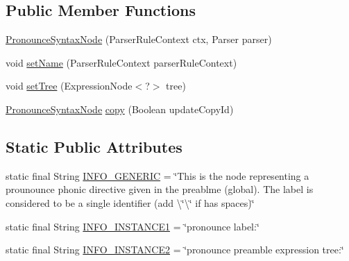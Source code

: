 \subsection*{Public Member Functions}
\begin{DoxyCompactItemize}
\item 
\hyperlink{classit_1_1emarolab_1_1cagg_1_1core_1_1language_1_1syntax_1_1abstractTree_1_1syntaxNodeType_1_1PronounceSyntaxNode_a4c5b3ed5af8e478d7720216115608e27}{Pronounce\-Syntax\-Node} (Parser\-Rule\-Context ctx, Parser parser)
\item 
void \hyperlink{classit_1_1emarolab_1_1cagg_1_1core_1_1language_1_1syntax_1_1abstractTree_1_1syntaxNodeType_1_1PronounceSyntaxNode_aa92e590581339e65323a09a8c3d971b4}{set\-Name} (Parser\-Rule\-Context parser\-Rule\-Context)
\item 
void \hyperlink{classit_1_1emarolab_1_1cagg_1_1core_1_1language_1_1syntax_1_1abstractTree_1_1syntaxNodeType_1_1PronounceSyntaxNode_af9922ffb9217a5644c46b11cbda3cd87}{set\-Tree} (Expression\-Node$<$?$>$ tree)
\item 
\hyperlink{classit_1_1emarolab_1_1cagg_1_1core_1_1language_1_1syntax_1_1abstractTree_1_1syntaxNodeType_1_1PronounceSyntaxNode}{Pronounce\-Syntax\-Node} \hyperlink{classit_1_1emarolab_1_1cagg_1_1core_1_1language_1_1syntax_1_1abstractTree_1_1syntaxNodeType_1_1PronounceSyntaxNode_aea92e0fef62d0d6a946026b843443093}{copy} (Boolean update\-Copy\-Id)
\end{DoxyCompactItemize}
\subsection*{Static Public Attributes}
\begin{DoxyCompactItemize}
\item 
static final String \hyperlink{classit_1_1emarolab_1_1cagg_1_1core_1_1language_1_1syntax_1_1abstractTree_1_1syntaxNodeType_1_1PronounceSyntaxNode_a3344aa57e56babfc6981dea0a04d538f}{I\-N\-F\-O\-\_\-\-G\-E\-N\-E\-R\-I\-C} = \char`\"{}This is the node representing a prounounce phonic directive given in the preablme (global). The label is considered to be a single identifier (add \textbackslash{}\char`\"{}\textbackslash{}\char`\"{} if has spaces)\char`\"{}
\item 
static final String \hyperlink{classit_1_1emarolab_1_1cagg_1_1core_1_1language_1_1syntax_1_1abstractTree_1_1syntaxNodeType_1_1PronounceSyntaxNode_a727e22e1d97bd5c34c7c4e3b254cadd3}{I\-N\-F\-O\-\_\-\-I\-N\-S\-T\-A\-N\-C\-E1} = \char`\"{}pronounce label\-:\char`\"{}
\item 
static final String \hyperlink{classit_1_1emarolab_1_1cagg_1_1core_1_1language_1_1syntax_1_1abstractTree_1_1syntaxNodeType_1_1PronounceSyntaxNode_a8ac90b29969daf0c0b6332321bb52411}{I\-N\-F\-O\-\_\-\-I\-N\-S\-T\-A\-N\-C\-E2} = \char`\"{}pronounce preamble expression tree\-:\char`\"{}
\end{DoxyCompactItemize}
